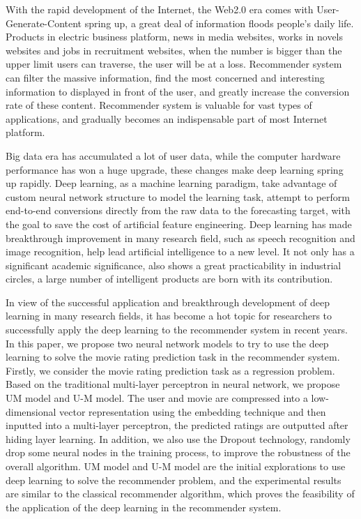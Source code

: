 \begin{eabstract}
With the rapid development of the Internet, the Web2.0 era comes with User-Generate-Content spring up,
a great deal of information floods people's daily life. Products in electric business platform, 
news in media websites, works in novels websites and jobs in recruitment websites,
when the number is bigger than the upper limit users can traverse, the user will be at a loss.
Recommender system can filter the massive information, 
find the most concerned and interesting information to displayed in front of the user,
and greatly increase the conversion rate of these content.
Recommender system is valuable for vast types of applications,
and gradually becomes an indispensable part of most Internet platform.

Big data era has accumulated a lot of user data, while the computer hardware performance has
won a huge upgrade, these changes make deep learning spring up rapidly.
Deep learning, as a machine learning paradigm, take advantage of custom neural network structure
to model the learning task, attempt to perform end-to-end conversions directly from the raw data
to the forecasting target, with the goal to save the cost of artificial feature engineering.
Deep learning has made breakthrough improvement in many research field, such as speech recognition
and image recognition, help lead artificial intelligence to a new level.
It not only has a significant academic significance, also shows a great practicability in
industrial circles, a large number of intelligent products are born with its contribution.

In view of the successful application and breakthrough development of deep learning in many research fields,
it has become a hot topic for researchers to successfully apply the deep learning to the recommender system in recent years.
In this paper, we propose two neural network models to try to use the deep learning
to solve the movie rating prediction task in the recommender system.
Firstly, we consider the movie rating prediction task as a regression problem.
Based on the traditional multi-layer perceptron in neural network, we propose UM model and U-M model.
The user and movie are compressed into a low-dimensional vector representation using the embedding technique and
then inputted into a multi-layer perceptron, the predicted ratings are outputted after hiding layer learning.
In addition, we also use the Dropout technology, randomly drop some neural nodes in the training process,
to improve the robustness of the overall algorithm.
UM model and U-M model are the initial explorations to use deep learning to solve the recommender problem,
and the experimental results are similar to the classical recommender algorithm,
which proves the feasibility of the application of the deep learning in the recommender system.


\end{eabstract}
